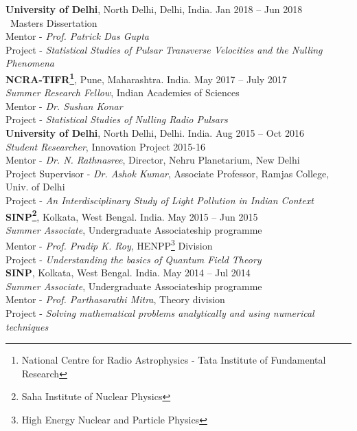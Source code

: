 {\bf University of Delhi}, North Delhi, Delhi, India. \hfill{Jan 2018 -- Jun 2018}\\
{\ Masters Dissertation}\\
Mentor - {\em Prof. Patrick Das Gupta}\\
Project - {\em Statistical Studies of Pulsar Transverse Velocities and the Nulling Phenomena}\\

{\bf NCRA-TIFR\footnote{National Centre for Radio Astrophysics - Tata Institute of Fundamental Research}}, Pune, Maharashtra. India. \hfill{May 2017 -- July 2017}\\
{\em Summer Research Fellow}, Indian Academies of Sciences\\
Mentor - {\em Dr. Sushan Konar}\\
Project - {\em Statistical Studies of Nulling Radio Pulsars}\\

{\bf University of Delhi}, North Delhi, Delhi. India. \hfill{Aug 2015 -- Oct 2016}\\
{\em Student Researcher}, Innovation Project 2015-16\\
Mentor - {\em Dr. N. Rathnasree}, Director, Nehru Planetarium, New Delhi\\
Project Supervisor - {\em Dr. Ashok Kumar}, Associate Professor, Ramjas College, Univ. of Delhi\\
Project - {\em An Interdisciplinary Study of Light Pollution in Indian Context}\\

{\bf SINP\footnote{Saha Institute of Nuclear Physics}}, Kolkata, West Bengal. India. \hfill{May 2015 -- Jun 2015}\\
{\em Summer Associate}, Undergraduate Associateship programme\\
Mentor - {\em Prof. Pradip K. Roy}, HENPP\footnote{High Energy Nuclear and Particle Physics} Division\\
Project - {\em Understanding the basics of Quantum Field Theory}\\

{\bf SINP}, Kolkata, West Bengal. India. \hfill{May 2014 -- Jul 2014}\\
{\em Summer Associate}, Undergraduate Associateship programme\\
Mentor - {\em Prof. Parthasarathi Mitra}, Theory division\\
Project - {\em Solving mathematical problems analytically and using numerical techniques}\\
